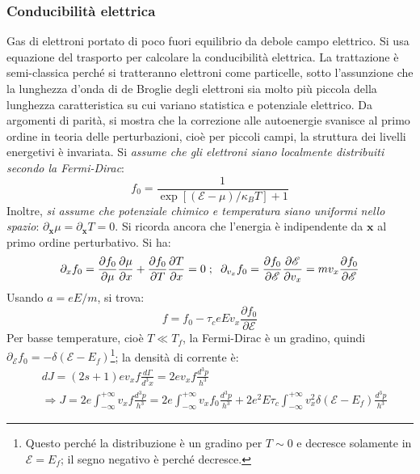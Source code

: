 \documentclass[10pt, a4paper]{scrartcl}
\numberwithin{equation}{subsection}
\theoremstyle{style1}
\theoremstyle{style2}
\begin{document}
\subsubsection{Conducibilit\`a elettrica}
Gas di elettroni portato di poco fuori equilibrio da debole campo elettrico.
Si usa equazione del trasporto per calcolare la conducibilit\`a elettrica.
La trattazione \`e semi-classica perch\'e si tratteranno elettroni come particelle, sotto l'assunzione che la lunghezza d'onda
di de Broglie degli elettroni sia molto pi\`u piccola della lunghezza caratteristica su cui variano statistica e potenziale elettrico.
Da argomenti di parit\`a, si mostra che la correzione alle autoenergie svanisce al primo ordine in teoria delle perturbazioni, cio\`e per piccoli campi,
la struttura dei livelli energetivi \`e invariata.
Si \textit{assume che gli elettroni siano localmente distribuiti secondo la Fermi-Dirac}:
\begin{equation}
	f_0 = \frac{1}{\exp\left[ (\mathscr{E}-\mu ) /\kappa _B T  \right] +1}
\end{equation}
Inoltre, \textit{si assume che potenziale chimico e temperatura siano uniformi nello spazio}: $\partial _\mathbf{x} \mu = \partial _\mathbf{x} T = 0$.
Si ricorda ancora che l'energia \`e indipendente da $\mathbf{x} $ al primo ordine perturbativo.
Si ha:
\[
	\partial _x f_0 = \frac{\partial f_0}{\partial \mu } \frac{\partial \mu }{\partial x} + \frac{\partial f_0}{\partial T} \frac{\partial T}{\partial x} = 0 \hspace{.1cm} ; \hspace{.2cm} \partial _{v_x} f_0 = \frac{\partial f_0}{\partial \mathscr{E}} \frac{\partial \mathscr{E}}{\partial v_x} = mv_x \frac{\partial f_0}{\partial \mathscr{E}} 
\] 
Usando $a = eE / m$, si trova:
\begin{equation}
	f = f_0- \tau _c e E v_x \frac{\partial f_0}{\partial \mathscr{E}} 
\end{equation}
Per basse temperature, cio\`e $T\ll T_f$, la Fermi-Dirac \`e un gradino, quindi $\partial _\mathscr{E} f_0 = -\delta  (\mathscr{E}-E_f)$\footnote{Questo perch\'e la distribuzione \`e un gradino per $T\sim 0 $ e decresce solamente in $\mathscr{E} = E_f$; il segno negativo \`e perch\'e decresce.};
la densit\`a di corrente \`e:
\begin{equation}
	\begin{split}
		&dJ = (2s+1) ev_x f \frac{d \Gamma}{d ^3 x}  = 2ev_x f \frac{d^3 p}{h^3}\\
		&\Rightarrow J = 2e \int_{-\infty} ^{+\infty}  v_x f \frac{d^3 p}{h^3} = 2e \int_{-\infty} ^{+\infty}  v_x f_0 \frac{d^3 p}{h^3} + 2e^2 E \tau _c \int_{-\infty} ^{+\infty}  v_x^2 \delta (\mathscr{E}-E_f) \frac{d^3p}{ h^3} 
	\end{split}
\end{equation}
\end{document}
